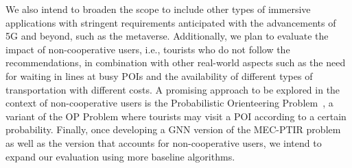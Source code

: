 {We also intend to broaden the scope to include other types of immersive applications with stringent requirements anticipated with the advancements of 5G and beyond, such as the metaverse. Additionally, we plan to evaluate the impact of non-cooperative users, i.e., tourists who do not follow the recommendations, in combination with other real-world aspects such as the need for waiting in lines at busy POIs and the availability of different types of transportation with different costs. A promising approach to be explored in the context of non-cooperative users is the Probabilistic Orienteering Problem~\cite{angelelli-probabilistic:17}, a variant of the OP Problem where tourists may visit a POI according to a certain probability. Finally, once developing a GNN version of the MEC-PTIR problem as well as the version that accounts for non-cooperative users, we intend to expand our evaluation using more baseline algorithms.} 